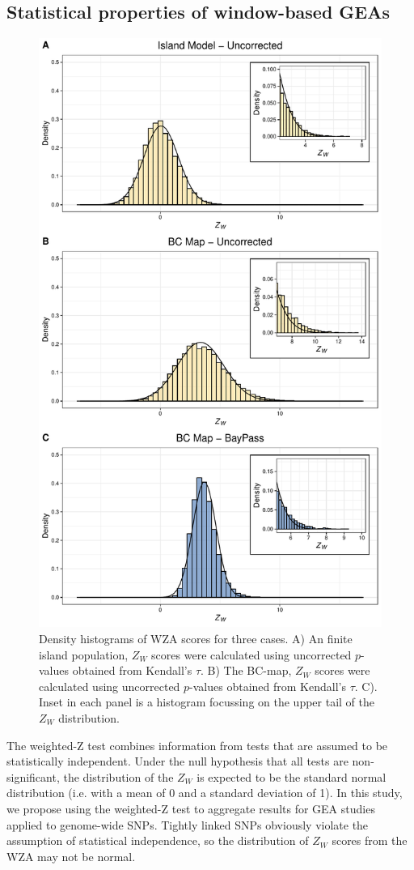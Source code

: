 \documentclass[11pt,twoside,lineno]{GSA_format}
\begin{document}
\subsection{Statistical properties of window-based GEAs}

\begin{figure}[H]
  \includegraphics[width=0.6\linewidth,keepaspectratio]{Plots/neutralResults_histogram.pdf} 

  \caption{Density histograms of WZA scores for three cases. A) An finite island population, $Z_W$ scores were calculated using uncorrected $p$-values obtained from Kendall's $\tau$. B)  The BC-map, $Z_W$ scores were calculated using uncorrected $p$-values obtained from Kendall's $\tau$. C). Inset in each panel is a histogram focussing on the upper tail of the $Z_W$ distribution.}
  
  \label{fig:NeutralHistograms}
\end{figure}

The weighted-Z test combines information from tests that are assumed to be statistically independent. Under the null hypothesis that all tests are non-significant, the distribution of the $Z_W$ is expected to be the standard normal distribution (i.e. with a mean of 0 and a standard deviation of 1). In this study, we propose using the weighted-Z test to aggregate results for GEA studies applied to genome-wide SNPs. Tightly linked SNPs obviously violate the assumption of statistical independence, so the distribution of $Z_W$ scores from the WZA may not be normal. 
\end{document}
